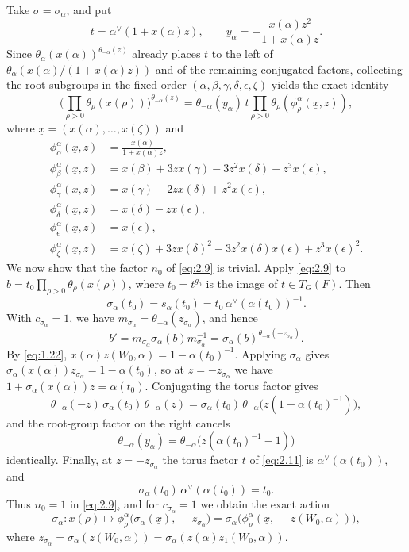 \documentclass[12pt,letterpaper]{amsart}
\theoremstyle{plain}
\theoremstyle{definition}
\theoremstyle{remark}
\theoremstyle{definition}
\newcommand{\eps}{\epsilon}
\newcommand{\unx}{\underline{x}}
\begin{document}
Take $\sigma=\sigma_\alpha$, and put
\[
t = \alpha^\vee(1+x(\alpha)z),\qquad
y_\alpha = -\frac{x(\alpha)z^2}{1+x(\alpha)z}.
\]
Since $\theta_\alpha(x(\alpha))^{\theta_{-\alpha}(z)}$
already places $t$ to the left of
$\theta_\alpha(x(\alpha)/(1+x(\alpha)z))$ and of the remaining conjugated
factors, collecting the root subgroups in the fixed order
$(\alpha,\beta,\gamma,\delta,\eps,\zeta)$ yields the exact identity
\begin{equation}\tag{2.11}\label{eq:2.11}
\Big(\prod_{\rho >0}\theta_\rho(x(\rho))\Big)^{\theta_{-\alpha}(z)}
=\theta_{-\alpha}(y_\alpha)\,
t\prod_{\rho >0}\theta_\rho(\phi_\rho^\alpha(\unx,z)),
\end{equation}
where $\unx =(x(\alpha),\dots, x(\zeta))$ and
\[
\begin{split}
\phi_\alpha^\alpha(\unx,z)
&=\frac{x(\alpha)}{1+x(\alpha)z},\\
\phi_\beta^\alpha(\unx,z)
&=x(\beta)+3zx(\gamma)-3z^2x(\delta)+z^3x(\eps),\\
\phi_\gamma^\alpha(\unx,z)
&=x(\gamma)-2zx(\delta)+z^2x(\eps),\\
\phi_\delta^\alpha(\unx,z)
&=x(\delta)-zx(\eps),\\
\phi_{\eps}^\alpha(\unx,z)
&=x(\eps),\\
\phi_\zeta^\alpha(\unx,z)
&=x(\zeta)+3zx(\delta)^2-3z^2x(\delta)x(\eps)+z^3x(\eps)^2.
\end{split}
\]
We now show that the factor $n_0$ of \eqref{eq:2.9} is trivial. Apply
\eqref{eq:2.9} to $b=t_0\prod_{\rho>0}\theta_\rho(x(\rho))$, where
$t_0=t^{g_0}$ is the image of $t\in T_G(F)$. Then
\[
\sigma_\alpha(t_0)=s_\alpha(t_0)=t_0\,\alpha^\vee(\alpha(t_0))^{-1}.
\]
With $c_{\sigma_\alpha}=1$, we have
$m_{\sigma_\alpha}=\theta_{-\alpha}(z_{\sigma_\alpha})$, and hence
\[
b'=m_{\sigma_\alpha}\sigma_\alpha(b)m_{\sigma_\alpha}^{-1}
=\sigma_\alpha(b)^{\theta_{-\alpha}(-z_{\sigma_\alpha})}.
\]
By \eqref{eq:1.22}, $x(\alpha)z(W_0,\alpha)=1-\alpha(t_0)^{-1}$. Applying
$\sigma_\alpha$ gives $\sigma_\alpha(x(\alpha))z_{\sigma_\alpha}=1-\alpha(t_0)$,
so at $z=-z_{\sigma_\alpha}$ we have $1+\sigma_\alpha(x(\alpha))z=\alpha(t_0)$.
Conjugating the torus factor gives
\[
\theta_{-\alpha}(-z)\,\sigma_\alpha(t_0)\,\theta_{-\alpha}(z)
=\sigma_\alpha(t_0)\,\theta_{-\alpha}\bigl(z(1-\alpha(t_0)^{-1})\bigr),
\]
and the root-group factor on the right cancels
\[
\theta_{-\alpha}(y_\alpha)=\theta_{-\alpha}\bigl(z(\alpha(t_0)^{-1}-1)\bigr)
\]
identically. Finally, at $z=-z_{\sigma_\alpha}$ the torus factor $t$ of
\eqref{eq:2.11} is $\alpha^\vee(\alpha(t_0))$, and
\[
\sigma_\alpha(t_0)\,\alpha^\vee(\alpha(t_0))=t_0.
\] Thus $n_0=1$ in
\eqref{eq:2.9}, and for $c_{\sigma_\alpha}=1$ we obtain the exact action
\begin{equation}\tag{2.12}\label{eq:2.12}
\sigma_\alpha :x(\rho)\longmapsto
\phi_\rho^\alpha\big(\sigma_\alpha(\unx),\,-z_{\sigma_\alpha}\big)
=\sigma_\alpha\big(\phi_\rho^\alpha(\unx,\,-z(W_0,\alpha))\big),
\end{equation}
where $z_{\sigma_\alpha}=\sigma_\alpha(z(W_0,\alpha))=\sigma_\alpha(z(\alpha)z_1(W_0,\alpha))$.
\end{document}
